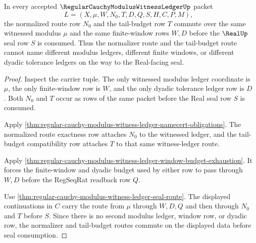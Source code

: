 \begin{theorem}
\label{thm:regular-cauchy-modulus-witness-ledger-normalizer-tail-commutation}
In every accepted $\RegularCauchyModulusWitnessLedgerUp$ packet
$$
L=(X,\mu,W,N_0,T,D,Q,S,H,C,P,M),
$$
the normalized route row $N_0$ and the tail-budget row $T$ commute over the same witnessed modulus $\mu$ and the same finite-window rows $W,D$ before the $\RealUp$ seal row $S$ is consumed. Thus the normalizer route and the tail-budget route cannot name different modulus ledgers, different finite windows, or different dyadic tolerance ledgers on the way to the Real-facing seal.
\end{theorem}
\begin{proof}
Inspect the carrier tuple. The only witnessed modulus ledger coordinate is $\mu$, the only finite-window row is $W$, and the only dyadic tolerance ledger row is $D$. Both $N_0$ and $T$ occur as rows of the same packet before the Real seal row $S$ is consumed.

Apply \autoref{thm:regular-cauchy-modulus-witness-ledger-namecert-obligations}. The normalized route exactness row attaches $N_0$ to the witnessed ledger, and the tail-budget compatibility row attaches $T$ to that same witness-ledger route.

Apply \autoref{thm:regular-cauchy-modulus-witness-ledger-window-budget-exhaustion}. It forces the finite-window and dyadic budget used by either row to pass through $W,D$ before the RegSeqRat readback row $Q$.

Use \autoref{thm:regular-cauchy-modulus-witness-ledger-seal-route}. The displayed continuations in $C$ carry the route from $\mu$ through $W,D,Q$ and then through $N_0$ and $T$ before $S$. Since there is no second modulus ledger, window row, or dyadic row, the normalizer and tail-budget routes commute on the displayed data before seal consumption.
\end{proof}

